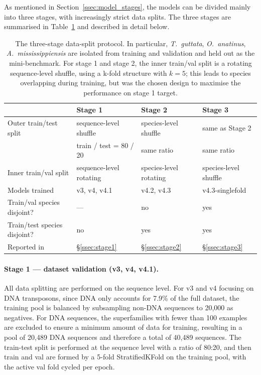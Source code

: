 \documentclass[12pt]{article}
\begin{document}
As mentioned in Section~\ref{ssec:model_stages}, the models can be divided mainly into three stages, with increasingly strict data splits. The three stages are summarised in Table~\ref{tab:splits} and described in detail below. 

\begin{table}[h]
\centering
\caption{The three-stage data-split protocol. In particular, \textit{T.~guttata}, \textit{O.~anatinus}, \textit{A.~mississippiensis} are isolated from training and validation and held out as the mini-benchmark. For stage 1 and stage 2, the inner train/val split is a rotating sequence-level shuffle, using a k-fold structure with $k=5$; this leads to species overlapping during training, but was the chosen design to maximise the performance on stage 1 target. }
\label{tab:splits}
\small
\begin{tabular}{llll}
\toprule
& Stage 1 & Stage 2 & Stage 3 \\
\midrule
Outer train/test split & sequence-level shuffle & species-level shuffle & same as Stage 2 \\
                       & train / test = 80 / 20  & same ratio & same ratio \\
Inner train/val split & sequence-level rotating & species-level rotating & species-level shuffle \\
Models trained        & v3, v4, v4.1 & v4.2, v4.3 & v4.3-singlefold \\
Train/val species disjoint? & --- & no & yes \\
Train/test species disjoint? & no & yes & yes \\
Reported in   & §\ref{ssec:stage1} & §\ref{ssec:stage2} & §\ref{ssec:stage3} \\
\bottomrule
\end{tabular}
\end{table}

\paragraph{Stage 1 --- dataset validation (v3, v4, v4.1).} All data splitting are performed on the sequence level. For v3 and v4 focusing on DNA transposons, since DNA only accounts for 7.9\% of the full dataset, the training pool is balanced by subsampling non-DNA sequences to 20{,}000 as negatives. For DNA sequences, the superfamilies with fewer than 100 examples are excluded to ensure a minimum amount of data for training, resulting in a pool of 20{,}489 DNA sequences and therefore a total of 40{,}489 sequences. The train-test split is performed at the sequence level with a ratio of 80:20, and then train and val are formed by a 5-fold StratifiedKFold on the training pool, with the active val fold cycled per epoch. 
\end{document}
